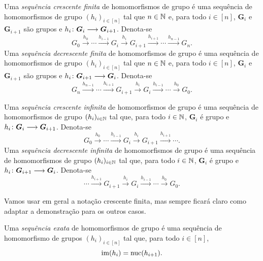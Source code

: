 \begin{definition}
Uma \emph{sequência crescente finita} de homomorfismos de grupo é uma sequência de homomorfismos de grupo $(h_i)_{i \in [n]}$ tal que $n \in \mathbb{N}$ e, para todo $i \in [n]$, $\bm G_i$ e $\bm G_{i+1}$ são grupos e ${h_i}\colon {\bm G_i} \longrightarrow {\bm G_{i+1}}$. Denota-se
	\begin{equation*}
	G_0 \overset{h_0}{\longrightarrow} \cdots \overset{h_{i-1}}{\longrightarrow} G_i \overset{h_i}{\longrightarrow} G_{i+1} \overset{h_{i+1}}{\longrightarrow} \cdots \overset{h_{n-1}}{\longrightarrow} G_{n}.
	\end{equation*}
Uma \emph{sequência decrescente finita} de homomorfismos de grupo é uma sequência de homomorfismos de grupo $(h_i)_{i \in [n]}$ tal que $n \in \mathbb{N}$ e, para todo $i \in [n]$, $\bm G_i$ e $\bm G_{i+1}$ são grupos e ${h_i}\colon {\bm G_{i+1}} \longrightarrow {\bm G_i}$. Denota-se
	\begin{equation*}
	G_n \overset{h_{n-1}}{\longrightarrow} \cdots \overset{h_{i+1}}{\longrightarrow} G_{i+1} \overset{h_i}{\longrightarrow} G_i \overset{h_{i-1}}{\longrightarrow} \cdots \overset{h_0}{\longrightarrow} G_0.
	\end{equation*}

Uma \emph{sequência crescente infinita} de homomorfismos de grupo é uma sequência de homomorfismos de grupo $(h_i)_{i \in \mathbb{N}}$ tal que, para todo $i \in \mathbb{N}$, $\bm G_i$ é grupo e ${h_i}\colon {\bm G_i} \longrightarrow {\bm G_{i+1}}$. Denota-se
	\begin{equation*}
	G_0 \overset{h_0}{\longrightarrow} \cdots \overset{h_{i-1}}{\longrightarrow} G_i \overset{h_i}{\longrightarrow} G_{i+1} \overset{h_{i+1}}{\longrightarrow} \cdots .
	\end{equation*}
Uma \emph{sequência decrescente infinita} de homomorfismos de grupo é uma sequência de homomorfismos de grupo $(h_i)_{i \in \mathbb{N}}$ tal que, para todo $i \in \mathbb{N}$, $\bm G_i$ é grupo e ${h_i}\colon {\bm G_{i+1}} \longrightarrow {\bm G_i}$. Denota-se
	\begin{equation*}
	\cdots \overset{h_{i+1}}{\longrightarrow} G_{i+1} \overset{h_i}{\longrightarrow} G_i \overset{h_{i-1}}{\longrightarrow} \cdots \overset{h_0}{\longrightarrow} G_0.
	\end{equation*}
\end{definition}

Vamos usar em geral a notação crescente finita, mas sempre ficará claro como adaptar a demonstração para os outros casos.

\begin{definition}
Uma \emph{sequência exata} de homomorfismos de grupo é uma sequência de homomorfismo de grupos $(h_i)_{i \in [n]}$ tal que, para todo $i \in [n]$,
	\begin{equation*}
	\operatorname{im}(h_i) = \operatorname{nuc}(h_{i+1}).
	\end{equation*}
\end{definition}

